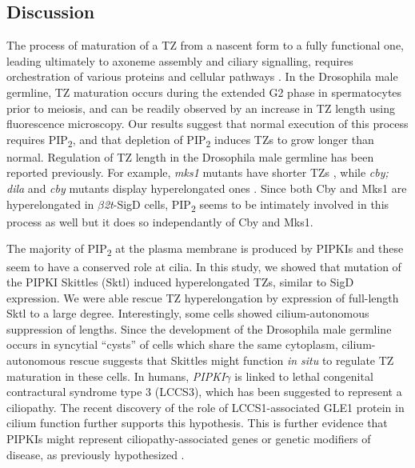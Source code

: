 \documentclass[12pt, twoside, letterpaper]{article}
\newcommand{\PIP}{PIP\textsubscript{2}}
\newcommand{\sigd}{$\beta$\textit{2t}-SigD}
\begin{document}
\begin{doublespacing}
\begin{linenumbers}
    \section{Discussion}
    The process of maturation of a TZ from a nascent form to a fully functional one,
    leading ultimately to axoneme assembly and ciliary signalling,
    requires orchestration of various proteins and cellular pathways
    \citep{reiter2012base}.
    In the Drosophila male germline, TZ maturation occurs during the
    extended G2 phase in spermatocytes prior to meiosis, and can be readily
    observed by an increase in TZ length using fluorescence microscopy.
    Our results suggest that normal execution of this process
    requires \PIP{}, and that depletion of \PIP{} induces TZs to
    grow longer than normal.
    Regulation of TZ length in the Drosophila male germline has been reported
    previously.
    For example, \textit{mks1} mutants have shorter TZs \citep{pratt2016drosophila},
    while
    \textit{cby; dila} and \textit{cby} mutants display hyperelongated ones
    \citep{enjolras2012drosophila,vieillard2016transition}.
    Since both Cby and Mks1 are hyperelongated in \sigd{} cells,
    \PIP{} seems to be intimately involved in this process as well but it does
    so independantly of Cby and Mks1.

    The majority of \PIP{} at the plasma membrane is produced by PIPKIs
    \citep{balla2013phosphoinositides, hammond2012pi4p}
    and these seem to have a conserved role at cilia.
    In this study, we showed that mutation of the PIPKI Skittles (Sktl)
    induced hyperelongated TZs, similar to SigD expression.
    We were able rescue TZ hyperelongation by expression of full-length Sktl to
    a large degree.
    Interestingly, some cells showed cilium-autonomous suppression of lengths.
    Since the development of the Drosophila male germline occurs in syncytial ``cysts''
    of cells which share the same cytoplasm,
    cilium-autonomous rescue suggests that Skittles might function \textit{in situ}
    to regulate TZ maturation in these cells.
    In humans, \textit{PIPKI$\gamma$} is linked to lethal congenital contractural
    syndrome type 3 (LCCS3), which has been suggested to represent a ciliopathy.
    The recent discovery of the role of LCCS1-associated GLE1 protein in cilium
    function \citep{jao2017role} further supports this hypothesis.
    This is further evidence that PIPKIs might represent ciliopathy-associated genes
    or genetic modifiers of disease, as previously hypothesized
    \citep{xu2016phosphatidylinositol}.


\end{linenumbers}
\end{doublespacing}
\end{document}
